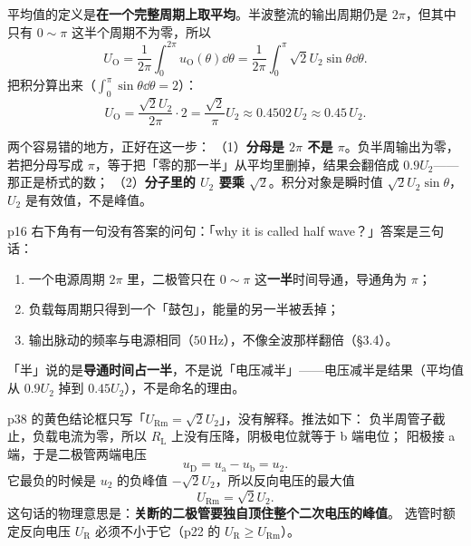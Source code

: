 \documentclass[11pt]{ctexart}
\begin{document}
平均值的定义是\textbf{在一个完整周期上取平均}。半波整流的输出周期仍是 $2\pi$，但其中只有 $0\sim\pi$ 这半个周期不为零，所以
\[
U_{\mathrm{O}}=\frac{1}{2\pi}\int_{0}^{2\pi}u_{\mathrm{O}}(\theta)\dd\theta
=\frac{1}{2\pi}\int_{0}^{\pi}\sqrt{2}U_2\sin\theta\dd\theta .
\]
把积分算出来（$\int_0^\pi\sin\theta\dd\theta=2$）：
\[
U_{\mathrm{O}}=\frac{\sqrt{2}U_2}{2\pi}\cdot 2
=\frac{\sqrt{2}}{\pi}U_2\approx0.4502\,U_2\approx0.45\,U_2 .
\]

两个容易错的地方，正好在这一步：
（1）\textbf{分母是 $2\pi$ 不是 $\pi$}。负半周输出为零，若把分母写成 $\pi$，等于把「零的那一半」从平均里删掉，结果会翻倍成 $0.9U_2$——那正是桥式的数；
（2）\textbf{分子里的 $U_2$ 要乘 $\sqrt{2}$}。积分对象是瞬时值 $\sqrt2U_2\sin\theta$，$U_2$ 是有效值，不是峰值。



p16 右下角有一句没有答案的问句：「why it is called half wave？」答案是三句话：
\begin{enumerate}
\item 一个电源周期 $2\pi$ 里，二极管只在 $0\sim\pi$ 这\textbf{一半}时间导通，导通角为 $\pi$；
\item 负载每周期只得到一个「鼓包」，能量的另一半被丢掉；
\item 输出脉动的频率与电源相同（$50\,\mathrm{Hz}$），不像全波那样翻倍（§3.4）。
\end{enumerate}
「半」说的是\textbf{导通时间占一半}，不是说「电压减半」——电压减半是结果（平均值从 $0.9U_2$ 掉到 $0.45U_2$），不是命名的理由。


p38 的黄色结论框只写「$U_{\mathrm{Rm}}=\sqrt2U_2$」，没有解释。推法如下：
负半周管子截止，负载电流为零，所以 $R_{\mathrm{L}}$ 上没有压降，阴极电位就等于 b 端电位；
阳极接 a 端，于是二极管两端电压
\[ u_{\mathrm{D}}=u_{\mathrm{a}}-u_{\mathrm{b}}=u_2 . \]
它最负的时候是 $u_2$ 的负峰值 $-\sqrt2U_2$，所以反向电压的最大值
\[ U_{\mathrm{Rm}}=\sqrt2U_2 . \]
这句话的物理意思是：\textbf{关断的二极管要独自顶住整个二次电压的峰值}。
选管时额定反向电压 $U_{\mathrm{R}}$ 必须不小于它（p22 的 $U_{\mathrm{R}}\ge U_{\mathrm{Rm}}$）。

\end{document}
